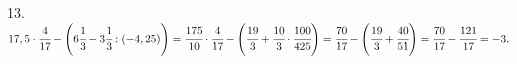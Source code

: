 13. $17,5\cdot\cfrac{4}{17}-\left(6\cfrac{1}{3}-3\cfrac{1}{3}:(-4,25)\right)=
\cfrac{175}{10}\cdot\cfrac{4}{17}-\left(\cfrac{19}{3}+\cfrac{10}{3}\cdot\cfrac{100}{425}\right)=
\cfrac{70}{17}-\left(\cfrac{19}{3}+\cfrac{40}{51}\right)=\cfrac{70}{17}-\cfrac{121}{17}=-3.$\\
